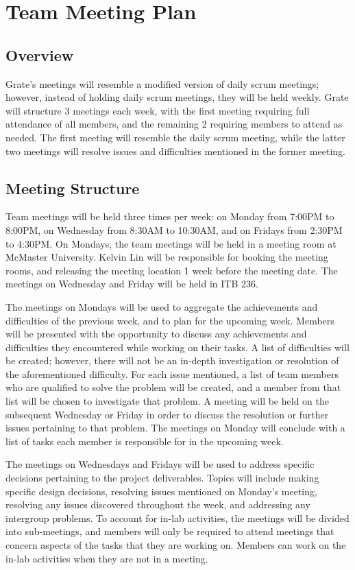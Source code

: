 \documentclass{article}
\begin{document}
\section{Team Meeting Plan}

\subsection{Overview}
Grate's meetings will resemble a modified version of daily scrum meetings; 
however, instead of holding daily scrum meetings, they will be held weekly. 
Grate will structure 3 meetings each week, with the first meeting requiring full 
attendance of all members, and the remaining 2 requiring members to attend as 
needed. The first meeting will resemble the daily scrum meeting, while the 
latter two meetings will resolve issues and difficulties mentioned in the former 
meeting.

\subsection{Meeting Structure}
Team meetings will be held three times per week: on Monday from 7:00PM to 
8:00PM, on Wednesday from 8:30AM to 10:30AM, and on Fridays from 2:30PM to 
4:30PM. On Mondays, the team meetings will be held in a meeting room at McMaster 
University. Kelvin Lin will be responsible for booking the meeting rooms, and 
releasing the meeting location 1 week before the meeting date. The meetings on 
Wednesday and Friday will be held in ITB 236.

The meetings on Mondays will be used to aggregate the achievements and 
difficulties of the previous week, and to plan for the upcoming week. Members 
will be presented with the opportunity to discuss any achievements and 
difficulties they encountered while working on their tasks. A list of 
difficulties will be created; however, there will not be an in-depth 
investigation or 
resolution of the aforementioned difficulty. For each issue mentioned, a list of 
team members who are qualified to solve the problem will be created, and a 
member from that list will be chosen to investigate that problem. A meeting will 
be held on the subsequent Wednesday or Friday in order to discuss the resolution 
or further issues pertaining to that problem. The meetings on Monday will 
conclude with a list of tasks each member is responsible for in the upcoming 
week.

The meetings on Wednesdays and Fridays will be used to address specific 
decisions pertaining to the project deliverables. Topics will include making 
specific design decisions, resolving issues mentioned on Monday's meeting, 
resolving any issues discovered throughout the week, and addressing any 
intergroup problems. To account for in-lab activities, the meetings will be 
divided into sub-meetings, and members will only be required to attend meetings 
that concern aspects of the tasks that they are working on. Members can work on 
the in-lab activities when they are not in a meeting. 
\end{document}
